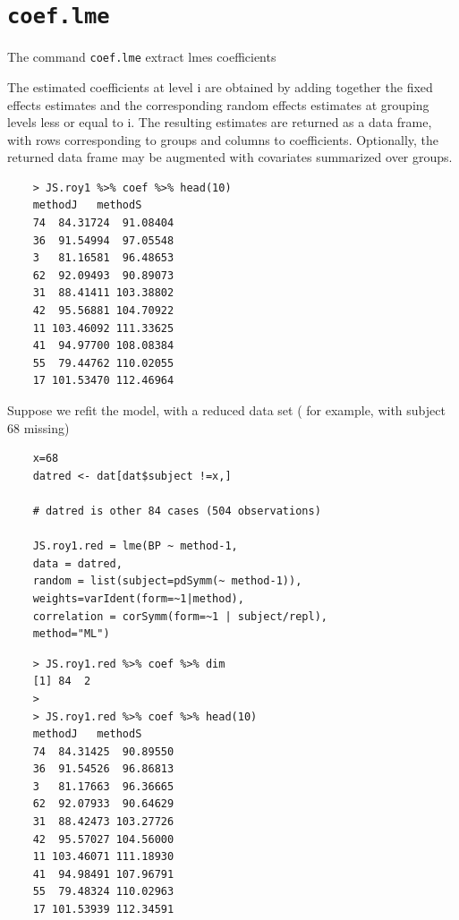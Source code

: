\documentclass[Main.tex]{subfiles}
\begin{document}
\section{\texttt{coef.lme}}

The command \texttt{coef.lme} extract lmes coefficients


The estimated coefficients at level i are obtained by adding together the fixed effects estimates and the corresponding random effects estimates at grouping levels less or equal to i. The resulting estimates are returned as a data frame, with rows corresponding to groups and columns to coefficients. Optionally, the returned data frame may be augmented with covariates summarized over groups.
\begin{framed}
	\begin{verbatim}
	> JS.roy1 %>% coef %>% head(10)
	methodJ   methodS
	74  84.31724  91.08404
	36  91.54994  97.05548
	3   81.16581  96.48653
	62  92.09493  90.89073
	31  88.41411 103.38802
	42  95.56881 104.70922
	11 103.46092 111.33625
	41  94.97700 108.08384
	55  79.44762 110.02055
	17 101.53470 112.46964
	\end{verbatim}
\end{framed}
Suppose we refit the model, with a reduced data set ( for example, with subject 68 missing)

\begin{framed}
	\begin{verbatim}
	x=68
	datred <- dat[dat$subject !=x,]
	
	# datred is other 84 cases (504 observations)
	
	JS.roy1.red = lme(BP ~ method-1, 
	data = datred,
	random = list(subject=pdSymm(~ method-1)), 
	weights=varIdent(form=~1|method),
	correlation = corSymm(form=~1 | subject/repl), 
	method="ML")
	\end{verbatim}
\end{framed}

\begin{framed}
	\begin{verbatim}
	> JS.roy1.red %>% coef %>% dim
	[1] 84  2
	>
	> JS.roy1.red %>% coef %>% head(10)
	methodJ   methodS
	74  84.31425  90.89550
	36  91.54526  96.86813
	3   81.17663  96.36665
	62  92.07933  90.64629
	31  88.42473 103.27726
	42  95.57027 104.56000
	11 103.46071 111.18930
	41  94.98491 107.96791
	55  79.48324 110.02963
	17 101.53939 112.34591
	
	\end{verbatim}
\end{framed}
\end{document}
